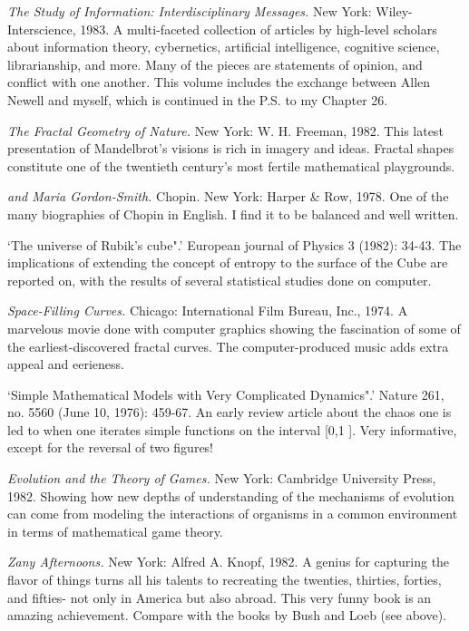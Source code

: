  {\sl The Study of Information: Interdisciplinary Messages.} New York: Wiley-Interscience, 1983. A multi-faceted collection of articles by high-level scholars about information theory, cybernetics, artificial intelligence, cognitive science, librarianship, and more. Many of the pieces are statements of opinion, and conflict with one another. This volume includes the exchange between Allen Newell and myself, which is continued in the P.S. to my Chapter 26.

 {\sl The Fractal Geometry of Nature.} New York: W. H. Freeman, 1982. This latest presentation of Mandelbrot's visions is rich in imagery and ideas. Fractal shapes constitute one of the twentieth century's most fertile mathematical playgrounds.

 {\sl and Maria Gordon-Smith.} Chopin. New York: Harper \& Row, 1978. One of the many biographies of Chopin in English. I find it to be balanced and well written.

 `The universe of Rubik's cube".' European journal of Physics 3 (1982): 34-43. The implications of extending the concept of entropy to the surface of the Cube are reported on, with the results of several statistical studies done on computer.

 {\sl Space-Filling Curves.} Chicago: International Film Bureau, Inc., 1974. A marvelous movie done with computer graphics showing the fascination of some of the earliest-discovered fractal curves. The computer-produced music adds extra appeal and eerieness.

 `Simple Mathematical Models with Very Complicated Dynamics".' Nature 261, no. 5560 (June 10, 1976): 459-67. An early review article about the chaos one is led to when one iterates simple functions on the interval [0,1 ]. Very informative, except for the reversal of two figures!

 {\sl Evolution and the Theory of Games.} New York: Cambridge University Press, 1982. Showing how new depths of understanding of the mechanisms of evolution can come from modeling the interactions of organisms in a common environment in terms of mathematical game theory.

 {\sl Zany Afternoons.} New York: Alfred A. Knopf, 1982. A genius for capturing the flavor of things turns all his talents to recreating the twenties, thirties, forties, and fifties- not only in America but also abroad. This very funny book is an amazing achievement. Compare with the books by Bush and Loeb (see above).

